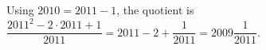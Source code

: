 Using $2010=2011-1$, the quotient is $\dfrac{2011^2-2\cdot2011+1}{2011}=2011-2+\dfrac{1}{2011}=\boxed{2009\dfrac{1}{2011}}$.
